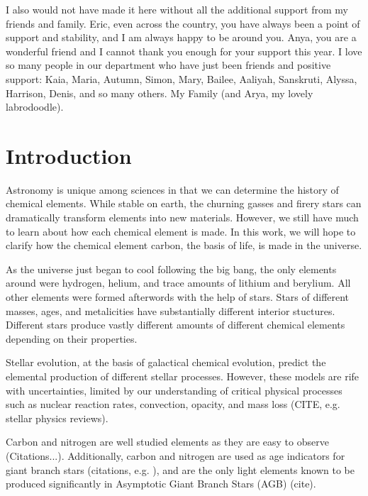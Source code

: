 \documentclass[12pt,oneside]{report}
\begin{document}
I also would not have made it here without all the additional support from my friends and family. Eric, even across the country, you have always been a point of support and stability, and I am always happy to be around you. Anya, you are a wonderful friend and I cannot thank you enough for your support this year. 
I love so many people in our department who have just been friends and positive support: Kaia, Maria, Autumn, Simon, Mary, Bailee, Aaliyah, Sanskruti, Alyssa, Harrison, Denis, and so many others. 
My Family (and Arya, my lovely labrodoodle).



\tableofcontents
\listoffigures
\listoftables
\newpage
{}



\chapter{Introduction}


Astronomy is unique among sciences in that we can determine the history of chemical elements. While stable on earth, the churning gasses and firery stars can dramatically transform elements into new materials. However, we still have much to learn about how each chemical element is made. In this work, we will hope to clarify how the chemical element carbon, the basis of life, is made in the universe.

As the universe just began to cool following the big bang, the only elements around were hydrogen, helium, and trace amounts of lithium and berylium. All other elements were formed afterwords with the help of stars. Stars of different masses, ages, and metalicities have substantially different interior stuctures. Different stars produce vastly different amounts of different chemical elements depending on their properties. 

Stellar evolution, at the basis of galactical chemical evolution, predict the elemental production of different stellar processes. 
However, these models are rife with uncertainties, limited by our understanding of critical physical processes such as nuclear reaction rates, convection, opacity, and mass loss (CITE, e.g. stellar physics reviews). 

Carbon and nitrogen are well studied elements as they are easy to observe (Citations...). Additionally, carbon and nitrogen are used as age indicators for giant branch stars (citations, e.g. \cite{fiorenzo+21}), and are the only light elements known to be produced significantly in Asymptotic Giant Branch Stars (AGB) (cite).
\end{document}
